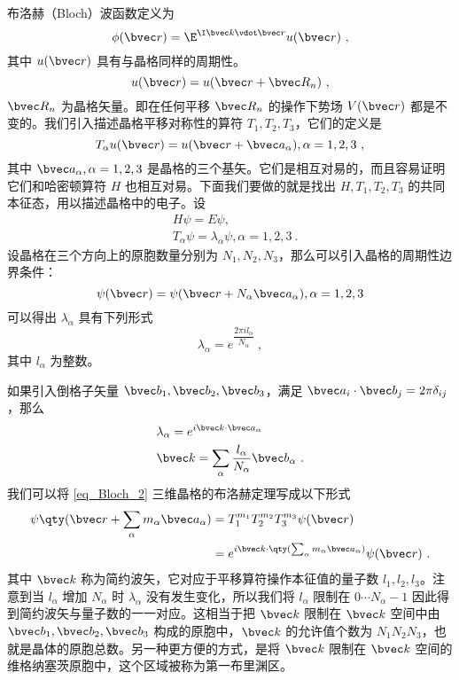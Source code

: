 \cite{黄昆}\cite{Bransden}布洛赫（Bloch）波函数定义为
\begin{equation}\label{eq_Bloch_2}
\phi(\bvec r) = \E^{\I \bvec k \vdot \bvec r} u(\bvec r)~,
\end{equation}
其中 $u(\bvec r)$ 具有与晶格同样的周期性。
\begin{equation}
u(\bvec r)=u(\bvec r+\bvec R_n)~,
\end{equation}
$\bvec R_n$ 为晶格矢量。即在任何平移 $\bvec R_n$ 的操作下势场 $V(\bvec r)$ 都是不变的。我们引入描述晶格平移对称性的算符 $T_1,T_2,T_3$，它们的定义是
\begin{equation}
T_\alpha u(\bvec r)= u(\bvec r+\bvec a_\alpha),\alpha=1,2,3~,
\end{equation}
其中 $\bvec a_\alpha,\alpha=1,2,3$ 是晶格的三个基矢。它们是相互对易的，而且容易证明它们和哈密顿算符 $H$ 也相互对易。下面我们要做的就是找出 $H,T_1,T_2,T_3$ 的共同本征态，用以描述晶格中的电子。设
\begin{equation}
\begin{aligned}
&H\psi=E\psi,\\
&T_\alpha \psi = \lambda_\alpha \psi, \alpha=1,2,3~.
\end{aligned}
\end{equation}
设晶格在三个方向上的原胞数量分别为 $N_1,N_2,N_3$，那么可以引入晶格的周期性边界条件：
\begin{equation}
\psi(\bvec r)=\psi(\bvec r+N_\alpha \bvec a_\alpha),\alpha=1,2,3
\end{equation}
可以得出 $\lambda_\alpha$ 具有下列形式
\begin{equation}
\lambda_\alpha=e^{ \dfrac{2\pi i l_\alpha}{N_\alpha}}~,
\end{equation}
其中 $l_\alpha$ 为整数。

如果引入倒格子矢量 $\bvec b_1,\bvec b_2,\bvec b_3$，满足 $\bvec a_i \cdot \bvec b_j = 2\pi \delta_{ij}$，那么
\begin{equation}
\begin{aligned}
&\lambda_\alpha = e^{i \bvec k \cdot \bvec a_\alpha}\\
&\bvec k=\sum_\alpha\frac{l_\alpha}{N_\alpha} \bvec b_\alpha~.
\end{aligned}
\end{equation}
我们可以将 \autoref{eq_Bloch_2} 三维晶格的布洛赫定理写成以下形式
\begin{equation}
\begin{aligned}
\psi\qty(\bvec r+\sum_\alpha m_\alpha\bvec a_\alpha) &= T_1^{m_1} T_2^{m_2} T_3^{m_3} \psi(\bvec r)\\
&=e^{i\bvec k\cdot \qty(\sum_\alpha m_\alpha\bvec a_\alpha)}\psi(\bvec r)~.
\end{aligned}
\end{equation}
其中 $\bvec k$ 称为简约波矢，它对应于平移算符操作本征值的量子数 $l_1,l_2,l_3$。注意到当 $l_\alpha$ 增加 $N_\alpha$ 时 $\lambda_\alpha$ 没有发生变化，所以我们将 $l_\alpha$ 限制在 $0\cdots N_\alpha-1$ 因此得到简约波矢与量子数的一一对应。这相当于把 $\bvec k$ 限制在 $\bvec k$ 空间中由 $\bvec b_1,\bvec b_2,\bvec b_3$ 构成的原胞中，$\bvec k$ 的允许值个数为 $N_1N_2N_3$，也就是晶体的原胞总数。另一种更方便的方式，是将 $\bvec k$ 限制在 $\bvec k$ 空间的维格纳塞茨原胞中，这个区域被称为第一布里渊区。